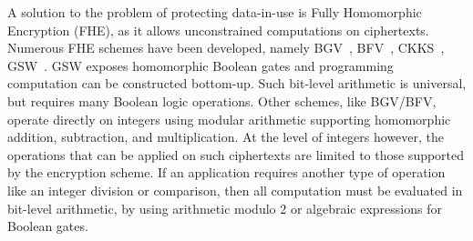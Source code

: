 A solution to the problem of protecting data-in-use is Fully Homomorphic Encryption (FHE), as it allows unconstrained computations on ciphertexts. Numerous FHE schemes have been developed, namely BGV~\cite{BGV_ref}, BFV~\cite{fan2012somewhatmisc}, CKKS~\cite{CKKS_ref}, GSW~\cite{GSW_ref}. 
GSW exposes homomorphic Boolean gates and programming computation can be constructed bottom-up.
Such bit-level arithmetic is universal, but requires many Boolean logic operations.
Other schemes, like BGV/BFV, operate directly on integers using modular arithmetic supporting homomorphic addition, subtraction, and multiplication.
At the level of integers however, the operations that can be applied on such ciphertexts are limited to those supported by the encryption scheme.
If an application requires another type of operation like an integer division or comparison, then all computation must be evaluated in bit-level arithmetic, by using arithmetic modulo 2 or algebraic expressions for Boolean gates.



